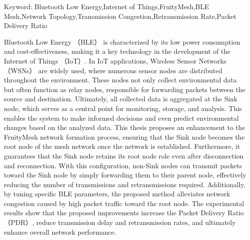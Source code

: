 \begin{EnAbstract}
    \begin{EnAbstractItems}
        \noindent \text Keyword: Bluetooth Low Energy,Internet of Things,FruityMesh,BLE Mesh,Network Topology,Transmission Congestion,Retransmission Rate,Packet Delivery Ratio
    \end{EnAbstractItems}

    \begin{EnAbstractDescription}
        Bluetooth Low Energy （BLE） is characterized by its low power consumption and cost-effectiveness, making it a key technology in the development of the Internet of Things （IoT）. In IoT applications, Wireless Sensor Networks （WSNs） are widely used, where numerous sensor nodes are distributed throughout the environment. These nodes not only collect environmental data but often function as relay nodes, responsible for forwarding packets between the source and destination. Ultimately, all collected data is aggregated at the Sink node, which serves as a central point for monitoring, storage, and analysis. This enables the system to make informed decisions and even predict environmental changes based on the analyzed data.
This thesis proposes an enhancement to the FruityMesh network formation process, ensuring that the Sink node becomes the root node of the mesh network once the network is established. Furthermore, it guarantees that the Sink node retains its root node role even after disconnection and reconnection. With this configuration, non-Sink nodes can transmit packets toward the Sink node by simply forwarding them to their parent node, effectively reducing the number of transmissions and retransmissions required. Additionally, by tuning specific BLE parameters, the proposed method alleviates network congestion caused by high packet traffic toward the root node. The experimental results show that the proposed improvements increase the Packet Delivery Ratio （PDR）, reduce transmission delay and retransmission rates, and ultimately enhance overall network performance.

    \end{EnAbstractDescription}
    
\end{EnAbstract}

